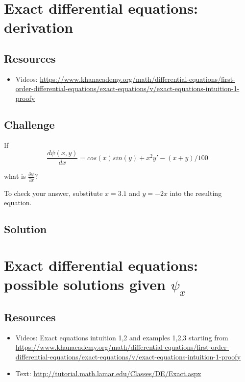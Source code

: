 \newpage
\section{Exact differential equations: derivation}

\subsection*{Resources}
\begin{itemize}
    \item Videos: \url{https://www.khanacademy.org/math/differential-equations/first-order-differential-equations/exact-equations/v/exact-equations-intuition-1-proofy}
\end{itemize}

\subsection*{Challenge}
If
\begin{equation}
    \frac{d \psi(x,y)}{dx} = cos(x)sin(y) + x^2y' - (x+y)/100
\end{equation}

what is $\displaystyle \frac{\partial \psi}{\partial x}$?

To check your answer, substitute $x=3.1$ and $y=-2x$ into the resulting equation.

\subsection*{Solution}
\six{}

\timebox




\newpage
\section{Exact differential equations: possible solutions given $\psi_x$}

\subsection*{Resources}
\begin{itemize}
    \item Videos: Exact equations intuition 1,2 and examples 1,2,3 starting from \url{https://www.khanacademy.org/math/differential-equations/first-order-differential-equations/exact-equations/v/exact-equations-intuition-1-proofy}
    \item Text: \url{http://tutorial.math.lamar.edu/Classes/DE/Exact.aspx}
\end{itemize}

